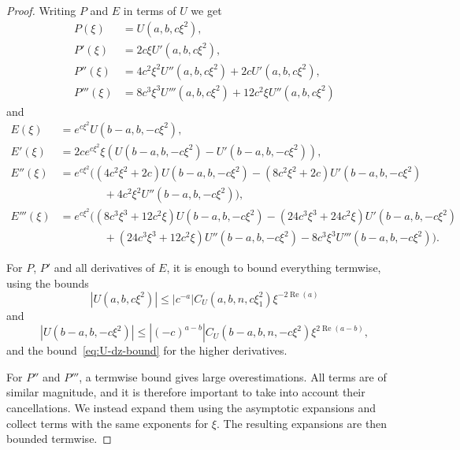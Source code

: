 \documentclass[11pt]{article}
\DeclareMathOperator{\real}{Re}
\begin{document}
\begin{proof}
  Writing \(P\) and \(E\) in terms of \(U\) we get
  \begin{align*}
    P(\xi)
    &= U(a, b, c\xi^{2}),\\
    P'(\xi)
    &= 2c\xi U'(a, b, c\xi^{2}),\\
    P''(\xi)
    &= 4c^{2}\xi^{2}U''(a, b, c\xi^{2}) + 2cU'(a, b, c\xi^{2}),\\
    P'''(\xi)
    &= 8c^{3}\xi^{3}U'''(a, b, c\xi^{2}) + 12c^{2}\xi U''(a, b, c\xi^{2})
  \end{align*}
  and
  \begin{align*}
    E(\xi)
    &= e^{c\xi^{2}}U(b - a, b, -c\xi^{2}),\\
    E'(\xi)
    &= 2ce^{c\xi^{2}}\xi(U(b - a, b, -c\xi^{2}) - U'(b - a, b, -c\xi^{2})),\\
    E''(\xi)
    &= e^{c\xi^{2}}\Big(
      (4c^{2}\xi^{2} + 2c)U(b - a, b, -c\xi^{2})
      - (8c^{2}\xi^{2} + 2c)U'(b - a, b, -c\xi^{2})\\
    &\qquad\qquad+ 4c^{2}\xi^{2}U''(b - a, b, -c\xi^{2})
      \Big),\\
    E'''(\xi)
    &= e^{c\xi^{2}}\Big(
      (8c^{3}\xi^{3} + 12c^{2}\xi)U(b - a, b, -c\xi^{2})
      - (24c^{3}\xi^{3} + 24c^{2}\xi)U'(b - a, b, -c\xi^{2})\\
    &\qquad\qquad+ (24c^{3}\xi^{3} + 12c^{2}\xi)U''(b - a, b, -c\xi^{2})
      - 8c^{3}\xi^{3}U'''(b - a, b, -c\xi^{2})
      \Big).
  \end{align*}

  For \(P\), \(P'\) and all derivatives of \(E\), it is enough to
  bound everything termwise, using the bounds
  \begin{equation*}
    |U(a, b, c\xi^{2})| \leq |c^{-a}|C_{U}(a, b, n, c\xi_{1}^{2})\xi^{-2\real(a)}
  \end{equation*}
  and
  \begin{equation*}
    |U(b - a, b, -c\xi^{2})| \leq |(-c)^{a - b}|C_{U}(b - a, b, n, -c\xi^{2})\xi^{2\real(a - b)},
  \end{equation*}
  and the bound~\eqref{eq:U-dz-bound} for the higher derivatives.

  For \(P''\) and \(P'''\), a termwise bound gives large
  overestimations. All terms are of similar magnitude, and it is
  therefore important to take into account their cancellations. We
  instead expand them using the asymptotic expansions and collect
  terms with the same exponents for \(\xi\). The resulting expansions
  are then bounded termwise.
\end{proof}
\end{document}
